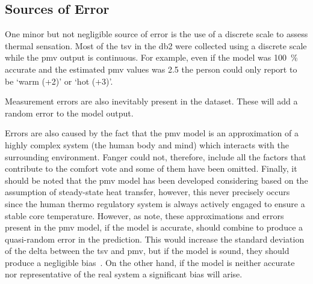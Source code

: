 \subsection{Sources of Error}\label{subsec:sources-of-error}
One minor but not negligible source of error is the use of a discrete scale to assess thermal sensation.
Most of the \ac{tsv} in the \gls{db2} were collected using a discrete scale while the \ac{pmv} output is continuous.
For example, even if the model was 100~\% accurate and the estimated \ac{pmv} values was \num{2.5} the person could only report to be `warm (+2)' or `hot (+3)'.

Measurement errors are also inevitably present in the dataset.
These will add a random error to the model output.

Errors are also caused by the fact that the \ac{pmv} model is an approximation of a highly complex system (the human body and mind) which interacts with the surrounding environment.
Fanger could not, therefore, include all the factors that contribute to the comfort vote and some of them have been omitted.
Finally, it should be noted that the \ac{pmv} model has been developed considering based on the assumption of steady-state heat transfer, however, this never precisely occurs since the human thermo regulatory system is always actively engaged to ensure a stable core temperature.
However, as  note, these approximations and errors present in the \ac{pmv} model, if the model is accurate, should combine to produce a quasi-random error in the prediction.
This would increase the standard deviation of the delta between the \ac{tsv} and \ac{pmv}, but if the model is sound, they should produce a negligible bias~\cite{Humphreys2002}.
On the other hand, if the model is neither accurate nor representative of the real system a significant bias will arise.
